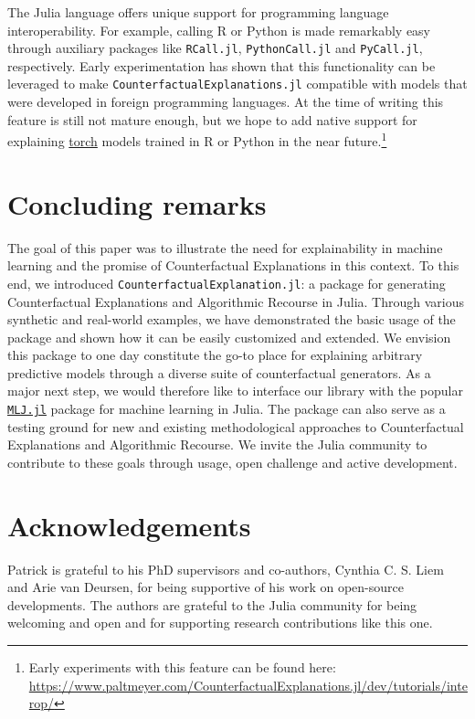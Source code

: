 \documentclass{juliacon}
\begin{document}
The Julia language offers unique support for programming language
interoperability. For example, calling R or Python is made remarkably
easy through auxiliary packages like \texttt{RCall.jl},
\texttt{PythonCall.jl} and \texttt{PyCall.jl}, respectively. Early
experimentation has shown that this functionality can be leveraged to
make \texttt{CounterfactualExplanations.jl} compatible with models that
were developed in foreign programming languages. At the time of writing
this feature is still not mature enough, but we hope to add native
support for explaining \href{https://pytorch.org/}{torch} models trained
in R or Python in the near future.\footnote{Early experiments with this
  feature can be found here:
  \url{https://www.paltmeyer.com/CounterfactualExplanations.jl/dev/tutorials/interop/}}

\hypertarget{sec-conclude}{%
\section{Concluding remarks}\label{sec-conclude}}

The goal of this paper was to illustrate the need for explainability in
machine learning and the promise of Counterfactual Explanations in this
context. To this end, we introduced
\texttt{CounterfactualExplanation.jl}: a package for generating
Counterfactual Explanations and Algorithmic Recourse in Julia. Through
various synthetic and real-world examples, we have demonstrated the
basic usage of the package and shown how it can be easily customized and
extended. We envision this package to one day constitute the go-to place
for explaining arbitrary predictive models through a diverse suite of
counterfactual generators. As a major next step, we would therefore like
to interface our library with the popular
\href{https://alan-turing-institute.github.io/MLJ.jl/dev/}{\texttt{MLJ.jl}}
package for machine learning in Julia. The package can also serve as a
testing ground for new and existing methodological approaches to
Counterfactual Explanations and Algorithmic Recourse. We invite the
Julia community to contribute to these goals through usage, open
challenge and active development.

\hypertarget{sec-ack}{%
\section{Acknowledgements}\label{sec-ack}}

Patrick is grateful to his PhD supervisors and co-authors, Cynthia C. S.
Liem and Arie van Deursen, for being supportive of his work on
open-source developments. The authors are grateful to the Julia
community for being welcoming and open and for supporting research
contributions like this one.


\end{document}
